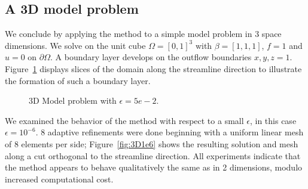 \subsection{A 3D model problem}

We conclude by applying the method to a simple model problem in 3 space dimensions.  We solve on the unit cube $\Omega = [0,1]^3$ with $\beta = [1,1,1]$, $f=1$ and $u=0$ on $\partial \Omega$.  A boundary layer develops on the outflow boundaries $x,y,z = 1$.  Figure~\ref{fig:3D5e2} displays slices of the domain along the streamline direction to illustrate the formation of such a boundary layer.  

\begin{figure}[!h]
\centering
{}
\caption{3D Model problem with $\epsilon = 5e-2$.}
\label{fig:3D5e2}
\end{figure}

We examined the behavior of the method with respect to a small $\epsilon$, in this case $\epsilon = 10^{-6}$.  8 adaptive refinements were done beginning with a uniform linear mesh of 8 elements per side; Figure~\ref{fig:3D1e6} shows the resulting solution and mesh along a cut orthogonal to the streamline direction.  All experiments indicate that the method appears to behave qualitatively the same as in 2 dimensions, modulo increased computational cost.

